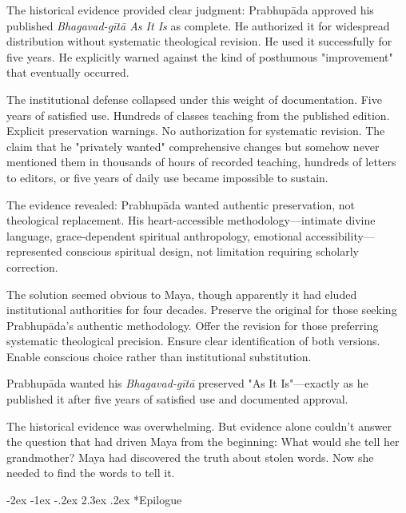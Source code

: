 \documentclass[12pt,twoside]{book}
\makeatletter
\renewcommand\section{\@startsection{section}{1}{\z@}%
{-3.5ex \@plus -1ex \@minus -.2ex}%
{2.3ex \@plus.2ex}%
{\normalfont\Large\bfseries}}
\let\oldsection\section
\renewcommand{\section}[1]{\needspace{4\baselineskip}\oldsection{#1}}
\def\cleardoublepage{\clearpage\if@twoside \ifodd\c@page\else\hbox{}\thispagestyle{empty}\newpage\if@twocolumn\hbox{}\newpage\fi\fi\fi}
\renewcommand\section{\@startsection{section}{1}{\z@}%
{-2ex \@plus -1ex \@minus -.2ex}%
{2.3ex \@plus.2ex}%
{\normalfont\Large\bfseries}}
\makeatother
\begin{document}
The historical evidence provided clear judgment: Prabhupāda approved his published \emph{Bhagavad-gītā As It Is} as complete. He authorized it for widespread distribution without systematic theological revision. He used it successfully for five years. He explicitly warned against the kind of posthumous "improvement" that eventually occurred.

The institutional defense collapsed under this weight of documentation. Five years of satisfied use. Hundreds of classes teaching from the published edition. Explicit preservation warnings. No authorization for systematic revision. The claim that he "privately wanted" comprehensive changes but somehow never mentioned them in thousands of hours of recorded teaching, hundreds of letters to editors, or five years of daily use became impossible to sustain.

The evidence revealed: Prabhupāda wanted authentic preservation, not theological replacement. His heart-accessible methodology—intimate divine language, grace-dependent spiritual anthropology, emotional accessibility—represented conscious spiritual design, not limitation requiring scholarly correction.

The solution seemed obvious to Maya, though apparently it had eluded institutional authorities for four decades. Preserve the original for those seeking Prabhupāda's authentic methodology. Offer the revision for those preferring systematic theological precision. Ensure clear identification of both versions. Enable conscious choice rather than institutional substitution.

Prabhupāda wanted his \emph{Bhagavad-gītā} preserved "As It Is"—exactly as he published it after five years of satisfied use and documented approval.

The historical evidence was overwhelming. But evidence alone couldn't answer the question that had driven Maya from the beginning: What would she tell her grandmother? Maya had discovered the truth about stolen words. Now she needed to find the words to tell it.

\cleardoublepage
{}
\vspace*{0.15\textheight}
\section*{Epilogue}
\thispagestyle{chapterpage}
\end{document}
